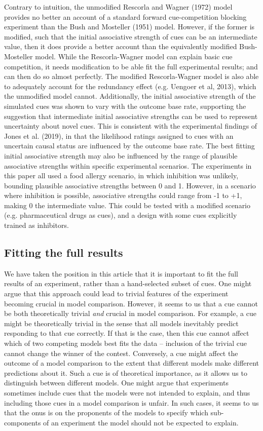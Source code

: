 \documentclass[twocolumn]{article}
\begin{document}
Contrary to intuition, the unmodified
Rescorla and Wagner (1972) model provides no better an account of a
standard forward cue-competition blocking experiment than the Bush and
Mosteller (1951) model. However, if the former is modified, such that
the initial associative strength of cues can be an intermediate value,
then it does provide a better account than the equivalently modified
Bush-Mosteller model. While the Rescorla-Wagner model can explain basic
cue competition, it needs modification to be able fit the full
experimental results; and can then do so almost perfectly. The modified
Rescorla-Wagner model is also able to adequately account for the
redundancy effect (e.g. Uengoer et al, 2013), which the unmodified model
cannot. Additionally, the initial associative strength of the simulated
cues was shown to vary with the outcome base rate, supporting the
suggestion that intermediate initial associative strengths can be used
to represent uncertainty about novel cues. This is consistent with the
experimental findings of Jones et al. (2019), in that the likelihood
ratings assigned to cues with an uncertain causal status are influenced
by the outcome base rate. The best fitting initial associative strength
may also be influenced by the range of plausible associative strengths
within specific experimental scenarios. The experiments in this paper
all used a food allergy scenario, in which inhibition was unlikely,
bounding plausible associative strengths between 0 and 1. However, in a
scenario where inhibition is possible, associative strengths could range
from -1 to +1, making 0 the intermediate value. This could be tested
with a modified scenario (e.g. pharmaceutical drugs as cues), and a
design with some cues explicitly trained as inhibitors.

\subsection{Fitting the full results}

We have taken the position in this
article that it is important to fit the full results of an experiment,
rather than a hand-selected subset of cues. One might argue that this
approach could lead to trivial features of the experiment becoming
crucial in model comparison. However, it seems to us that a cue cannot
be both theoretically trivial \emph{and} crucial in model comparison.
For example, a cue might be theoretically trivial in the sense that all
models inevitably predict responding to that cue correctly. If that is
the case, then this cue cannot affect which of two competing models best
fits the data -- inclusion of the trivial cue cannot change the winner
of the contest. Conversely, a cue might affect the outcome of a model
comparison to the extent that different models make different
predictions about it. Such a cue is of theoretical importance, as it
allows us to distinguish between different models. One might argue that
experiments sometimes include cues that the models were not intended to
explain, and thus including those cues in a model comparison is unfair.
In such cases, it seems to us that the onus is on the proponents of the
models to specify which sub-components of an experiment the model should
not be expected to explain.
\end{document}
